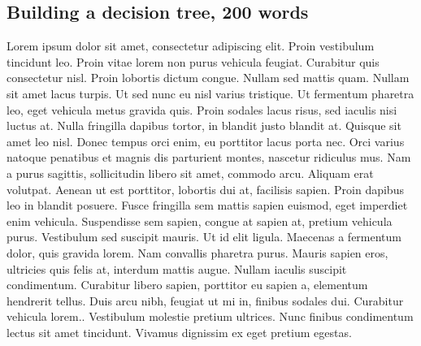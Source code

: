 \documentclass[techmemo]{ecmwfrep}%
\begin{document}
\subsection{Building a decision tree, 200 words}
Lorem ipsum dolor sit amet, consectetur adipiscing elit. Proin vestibulum tincidunt leo. Proin vitae lorem non purus vehicula feugiat. Curabitur quis consectetur nisl. Proin lobortis dictum congue. Nullam sed mattis quam. Nullam sit amet lacus turpis. Ut sed nunc eu nisl varius tristique. Ut fermentum pharetra leo, eget vehicula metus gravida quis. Proin sodales lacus risus, sed iaculis nisi luctus at. Nulla fringilla dapibus tortor, in blandit justo blandit at. Quisque sit amet leo nisl. Donec tempus orci enim, eu porttitor lacus porta nec. Orci varius natoque penatibus et magnis dis parturient montes, nascetur ridiculus mus. Nam a purus sagittis, sollicitudin libero sit amet, commodo arcu. Aliquam erat volutpat. Aenean ut est porttitor, lobortis dui at, facilisis sapien. Proin dapibus leo in blandit posuere. Fusce fringilla sem mattis sapien euismod, eget imperdiet enim vehicula. Suspendisse sem sapien, congue at sapien at, pretium vehicula purus. Vestibulum sed suscipit mauris. Ut id elit ligula. Maecenas a fermentum dolor, quis gravida lorem. Nam convallis pharetra purus. Mauris sapien eros, ultricies quis felis at, interdum mattis augue. Nullam iaculis suscipit condimentum. Curabitur libero sapien, porttitor eu sapien a, elementum hendrerit tellus. Duis arcu nibh, feugiat ut mi in, finibus sodales dui. Curabitur vehicula lorem.. Vestibulum molestie pretium ultrices. Nunc finibus condimentum lectus sit amet tincidunt. Vivamus dignissim ex eget pretium egestas.

\end{document}
